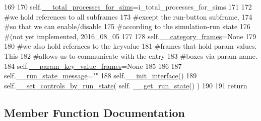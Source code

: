 \begin{DoxyCode}
169 
170         self.\hyperlink{classnegui_1_1pgguisimupop_1_1PGGuiSimuPop_a3885325060336297119229764f6548fb}{\_\_total\_processes\_for\_sims}=i\_total\_processes\_for\_sims
171 
172         \textcolor{comment}{#we hold references to all subframes}
173         \textcolor{comment}{#except the run-button subframe,}
174         \textcolor{comment}{#so that we can enable/disable}
175         \textcolor{comment}{#according to the simulation-run state}
176         \textcolor{comment}{#(not yet implemented, 2016\_08\_05}
177 
178         self.\hyperlink{classnegui_1_1pgguisimupop_1_1PGGuiSimuPop_a67da63f36462b56bd1f47206d8f91c7b}{\_\_category\_frames}=\textcolor{keywordtype}{None}
179 
180         \textcolor{comment}{#we also hold refernces to the keyvalue}
181         \textcolor{comment}{#frames that hold param values.  This}
182         \textcolor{comment}{#allows us to communicate with the entry}
183         \textcolor{comment}{#boxes via param name.}
184         self.\hyperlink{classnegui_1_1pgguisimupop_1_1PGGuiSimuPop_a272523ce4bad4d1073c506e858c59996}{\_\_param\_key\_value\_frames}=\textcolor{keywordtype}{None}
185 
186 
187         self.\hyperlink{classnegui_1_1pgguisimupop_1_1PGGuiSimuPop_a3ac3a7a5a800876180133b4cc41ca63c}{\_\_run\_state\_message}=\textcolor{stringliteral}{""}
188         self.\hyperlink{classnegui_1_1pgguisimupop_1_1PGGuiSimuPop_ad38b601eabe45f6c35525b060f0343ea}{\_\_init\_interface}()
189         self.\hyperlink{classnegui_1_1pgguisimupop_1_1PGGuiSimuPop_a2c5268e62f40c2548d1475959aa60ca9}{\_\_set\_controls\_by\_run\_state}( self.
      \hyperlink{classnegui_1_1pgguisimupop_1_1PGGuiSimuPop_aef182e14bccdbabf372a6344bc6f8786}{\_\_get\_run\_state}() )
190     
191         \textcolor{keywordflow}{return}
\end{DoxyCode}


\subsection{Member Function Documentation}
